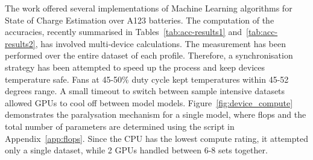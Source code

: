 The work offered several implementations of Machine Learning algorithms for State of Charge Estimation over A123 batteries.
The computation of the accuracies, recently summarised in Tables~\ref{tab:acc-results1} and~\ref{tab:acc-results2}, has involved multi-device calculations.
The measurement has been performed over the entire dataset of each profile.
Therefore, a synchronisation strategy has been attempted to speed up the process and keep devices temperature safe.
Fans at 45-50\% duty cycle kept temperatures within 45-52 degrees range.
A small timeout to switch between sample intensive datasets allowed GPUs to cool off between model models.
Figure~\ref{fig:device_compute} demonstrates the paralysation mechanism for a single model, where flops and the total number of parameters are determined using the script in Appendix~\ref{app:flops}.
Since the CPU has the lowest compute rating, it attempted only a single dataset, while 2 GPUs handled between 6-8 sets together. 


